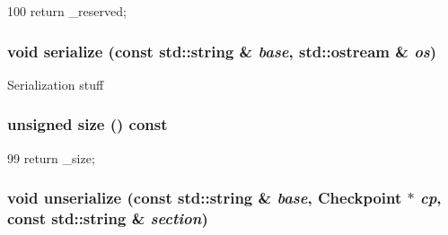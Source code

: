 \begin{DoxyCode}
100 { return _reserved; }
\end{DoxyCode}
\hypertarget{classPacketFifo_ab4138b21b48e3371a8e20df72b675a88}{
\subsubsection[{serialize}]{\setlength{\rightskip}{0pt plus 5cm}void serialize (const std::string \& {\em base}, \/  std::ostream \& {\em os})}}
\label{classPacketFifo_ab4138b21b48e3371a8e20df72b675a88}
Serialization stuff \hypertarget{classPacketFifo_acdb549c592f948a9d973d4d84b02ef87}{
\subsubsection[{size}]{\setlength{\rightskip}{0pt plus 5cm}unsigned size () const}}
\label{classPacketFifo_acdb549c592f948a9d973d4d84b02ef87}



\begin{DoxyCode}
99 { return _size; }
\end{DoxyCode}
\hypertarget{classPacketFifo_a147c320e3d6506edf5587a40cd8e430d}{
\subsubsection[{unserialize}]{\setlength{\rightskip}{0pt plus 5cm}void unserialize (const std::string \& {\em base}, \/  {\bf Checkpoint} $\ast$ {\em cp}, \/  const std::string \& {\em section})}}
\label{classPacketFifo_a147c320e3d6506edf5587a40cd8e430d}


